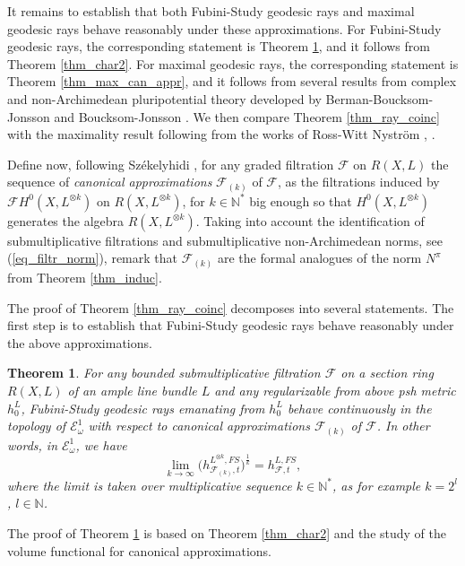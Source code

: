 \documentclass[12pt]{article}
\numberwithin{equation}{section}
\theoremstyle{theorem}
\newtheorem{thm}{Theorem}[section]
\theoremstyle{definition}
\theoremstyle{remark}
\newcommand{\nat}{\mathbb{N}}
\begin{document}
	It remains to establish that both Fubini-Study geodesic rays and maximal geodesic rays behave reasonably under these approximations.
	For Fubini-Study geodesic rays, the corresponding statement is Theorem \ref{thm_can_trunc_bergm}, and it follows from Theorem \ref{thm_char2}.
	For maximal geodesic rays, the corresponding statement is Theorem \ref{thm_max_can_appr}, and it follows from several results from complex and non-Archimedean pluripotential theory developed by Berman-Boucksom-Jonsson \cite{BerBouckJonYTD} and Boucksom-Jonsson \cite{BouckJohn21}.
	We then compare Theorem \ref{thm_ray_coinc} with the maximality result following from the works of Ross-Witt Nystr{\"o}m \cite{RossNystom}, \cite{RossNystAnalTConf}.
	\par
	Define now, following Sz{\'e}kelyhidi \cite{SzekeTestConf}, for any graded filtration $\mathcal{F}$ on $R(X, L)$ the sequence of \textit{canonical approximations} $\mathcal{F}_{(k)}$ of $\mathcal{F}$, as the filtrations induced by $\mathcal{F} H^0(X, L^{\otimes k})$ on $R(X, L^{\otimes k})$, for $k \in \nat^*$ big enough so that $H^0(X, L^{\otimes k})$ generates the algebra $R(X, L^{\otimes k})$.
	Taking into account the identification of submultiplicative filtrations and submultiplicative non-Archimedean norms, see (\ref{eq_filtr_norm}), remark that  $\mathcal{F}_{(k)}$ are the formal analogues of the norm $N^{\pi}$ from Theorem \ref{thm_induc}. 
	\par 
	The proof of Theorem \ref{thm_ray_coinc} decomposes into several statements.
	The first step is to establish that Fubini-Study geodesic rays behave reasonably under the above approximations.
	\begin{thm}\label{thm_can_trunc_bergm}
		For any bounded submultiplicative filtration $\mathcal{F}$ on a section ring $R(X, L)$ of an ample line bundle $L$ and any regularizable from above psh metric $h^L_0$, Fubini-Study geodesic rays emanating from $h^L_0$ behave continuously in the topology of $\mathcal{E}_{\omega}^1$ with respect to canonical approximations $\mathcal{F}_{(k)}$ of $\mathcal{F}$.
		In other words, in $\mathcal{E}_{\omega}^1$, we have
		\begin{equation}
			\lim_{k \to \infty} \big( h^{L^{\otimes k}, FS}_{\mathcal{F}_{(k)}, t} \big)^{\frac{1}{k}} = h^{L, FS}_{\mathcal{F}, t},
		\end{equation}
		where the limit is taken over multiplicative sequence $k \in \nat^*$, as for example $k = 2^l$, $l \in \nat$.
	\end{thm}
	The proof of Theorem \ref{thm_can_trunc_bergm} is based on Theorem \ref{thm_char2} and the study of the volume functional for canonical approximations.
\end{document}

